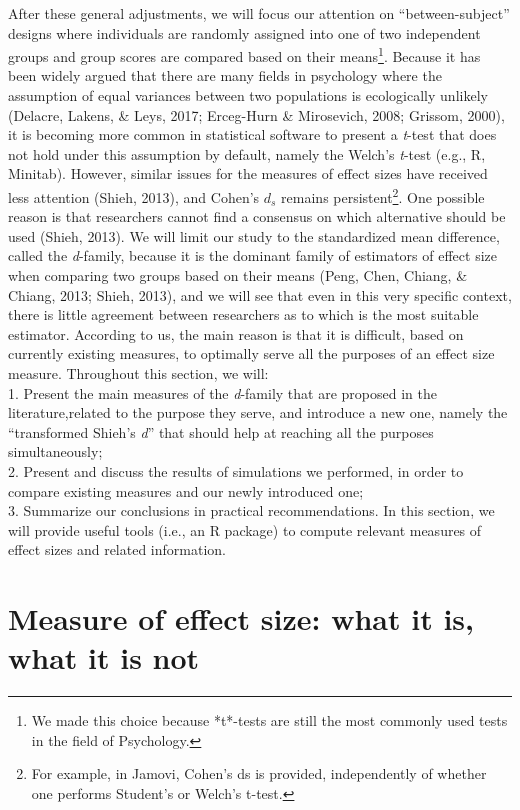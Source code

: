 \documentclass[
  man,floatsintext]{apa6}
\begin{document}
After these general adjustments, we will focus our attention on \enquote{between-subject} designs where individuals are randomly assigned into one of two independent groups and group scores are compared based on their means\footnote{We made this choice because *t*-tests are still the most commonly used tests in the field of Psychology.}. Because it has been widely argued that there are many fields in psychology where the assumption of equal variances between two populations is ecologically unlikely (Delacre, Lakens, \& Leys, 2017; Erceg-Hurn \& Mirosevich, 2008; Grissom, 2000), it is becoming more common in statistical software to present a \emph{t}-test that does not hold under this assumption by default, namely the Welch's \emph{t}-test (e.g., R, Minitab). However, similar issues for the measures of effect sizes have received less attention (Shieh, 2013), and Cohen's \(d_s\) remains persistent\footnote{For example, in Jamovi, Cohen's ds is provided, independently of whether one performs Student's or Welch's t-test.}. One possible reason is that researchers cannot find a consensus on which alternative should be used (Shieh, 2013). We will limit our study to the standardized mean difference, called the \emph{d}-family, because it is the dominant family of estimators of effect size when comparing two groups based on their means (Peng, Chen, Chiang, \& Chiang, 2013; Shieh, 2013), and we will see that even in this very specific context, there is little agreement between researchers as to which is the most suitable estimator. According to us, the main reason is that it is difficult, based on currently existing measures, to optimally serve all the purposes of an effect size measure. Throughout this section, we will:\\
1. Present the main measures of the \emph{d}-family that are proposed in the literature,related to the purpose they serve, and introduce a new one, namely the \enquote{transformed Shieh's \emph{d}} that should help at reaching all the purposes simultaneously;\\
2. Present and discuss the results of simulations we performed, in order to compare existing measures and our newly introduced one;\\
3. Summarize our conclusions in practical recommendations. In this section, we will provide useful tools (i.e., an R package) to compute relevant measures of effect sizes and related information.

\hypertarget{measure-of-effect-size-what-it-is-what-it-is-not}{%
\section{Measure of effect size: what it is, what it is not}\label{measure-of-effect-size-what-it-is-what-it-is-not}}
\end{document}
